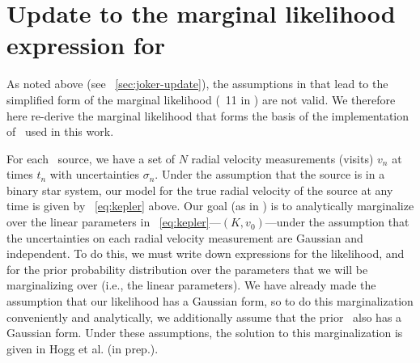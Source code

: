 \documentclass[modern]{aastex63}
\begin{document}
\appendix

\section{Update to the marginal likelihood expression for \thejoker}
\label{app:marginal-likelihood}

As noted above (see \sectionname~\ref{sec:joker-update}), the assumptions in
\cite{thejoker} that lead to the simplified form of the marginal likelihood
(\equationname~11 in \citealt{thejoker}) are not valid.
We therefore here re-derive the marginal likelihood that forms the basis of the
implementation of \thejoker\ used in this work.

For each \apogee\ source, we have a set of $N$ radial velocity measurements
(visits) $v_n$ at times $t_n$ with uncertainties $\sigma_n$.
Under the assumption that the source is in a binary star system, our model for
the true radial velocity of the source at any time is given by
\equationname~\ref{eq:kepler} above.
Our goal (as in \citealt{thejoker}) is to analytically marginalize over the
linear parameters in \equationname~\ref{eq:kepler}---$(K, v_0)$---under the
assumption that the uncertainties on each radial velocity measurement are
Gaussian and independent.
To do this, we must write down expressions for the likelihood, and for the prior
probability distribution over the parameters that we will be marginalizing over
(i.e., the linear parameters).
We have already made the assumption that our likelihood has a Gaussian form, so
to do this marginalization conveniently and analytically, we additionally assume
that the prior \pdf\ also has a Gaussian form.
Under these assumptions, the solution to this marginalization is given in
Hogg et al. (in prep.).
\end{document}
